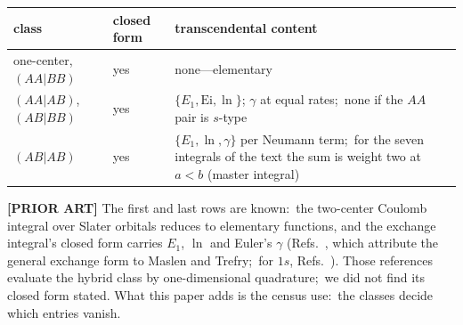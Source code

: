 \documentclass[aps,pra,twocolumn,superscriptaddress,longbibliography]{revtex4-2}
\begin{document}
\begin{center}
\begin{tabular}{lll}
\hline\hline
class & closed form & transcendental content \\
\hline
one-center, $(AA|BB)$ & yes & none---elementary \\
$(AA|AB)$, $(AB|BB)$  & yes & $\{E_1, \mathrm{Ei}, \ln\}$; $\gamma$ at equal rates;\ none if the $AA$ pair is $s$-type \\
$(AB|AB)$             & yes & $\{E_1, \ln, \gamma\}$ per Neumann term;\ for the seven integrals of the text the sum is weight two at $a<b$ (master integral) \\
\hline\hline
\end{tabular}
\end{center}

\textbf{[PRIOR ART]} The first and last rows are known:\ the two-center Coulomb
integral over Slater orbitals reduces to elementary functions, and the exchange
integral's closed form carries $E_1$, $\ln$ and Euler's $\gamma$
(Refs.~\cite{lesiuk2014a,lesiuk2014b}, which attribute the general exchange form to
Maslen and Trefry;\ for $1s$, Refs.~\cite{sugiura1927,ruedenberg1951}).  Those
references evaluate the hybrid class by one-dimensional quadrature;\ we did not find
its closed form stated.  What this paper adds is the census use:\ the
classes decide which entries vanish.
\end{document}
